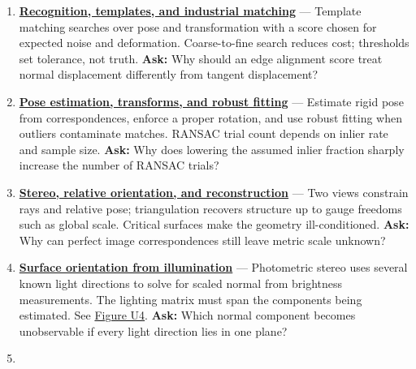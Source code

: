 \begin{enumerate}
\item
  \textbf{\href{Continuous\%20Notes/University\%20-\%20Worlds,\%20Images\%20and\%20Inference\%20-\%20Graphics,\%20Vision\%20and\%20Photography\#Recognition,\%20templates,\%20and\%20industrial\%20matching}{Recognition, templates, and industrial matching}} --- Template matching searches over pose and transformation with a score chosen for expected noise and deformation. Coarse-to-fine search reduces cost; thresholds set tolerance, not truth. \textbf{Ask:} Why should an edge alignment score treat normal displacement differently from tangent displacement?
\item
  \textbf{\href{Continuous\%20Notes/University\%20-\%20Worlds,\%20Images\%20and\%20Inference\%20-\%20Graphics,\%20Vision\%20and\%20Photography\#Pose\%20estimation,\%20transforms,\%20and\%20robust\%20fitting}{Pose estimation, transforms, and robust fitting}} --- Estimate rigid pose from correspondences, enforce a proper rotation, and use robust fitting when outliers contaminate matches. RANSAC trial count depends on inlier rate and sample size. \textbf{Ask:} Why does lowering the assumed inlier fraction sharply increase the number of RANSAC trials?
\item
  \textbf{\href{Continuous\%20Notes/University\%20-\%20Worlds,\%20Images\%20and\%20Inference\%20-\%20Graphics,\%20Vision\%20and\%20Photography\#Stereo,\%20relative\%20orientation,\%20and\%20reconstruction}{Stereo, relative orientation, and reconstruction}} --- Two views constrain rays and relative pose; triangulation recovers structure up to gauge freedoms such as global scale. Critical surfaces make the geometry ill-conditioned. \textbf{Ask:} Why can perfect image correspondences still leave metric scale unknown?
\item
  \textbf{\href{Continuous\%20Notes/University\%20-\%20Worlds,\%20Images\%20and\%20Inference\%20-\%20Graphics,\%20Vision\%20and\%20Photography\#Surface\%20orientation\%20from\%20illumination}{Surface orientation from illumination}} --- Photometric stereo uses several known light directions to solve for scaled normal from brightness measurements. The lighting matrix must span the components being estimated. See \href{Continuous\%20Notes/University\%20-\%20Worlds,\%20Images\%20and\%20Inference\%20-\%20Graphics,\%20Vision\%20and\%20Photography\#Figure\%20U4\%20-\%20Lighting\%20rank\%20determines\%20which\%20normal\%20components\%20can\%20be\%20measured}{Figure U4}. \textbf{Ask:} Which normal component becomes unobservable if every light direction lies in one plane?
\item

\end{enumerate}

